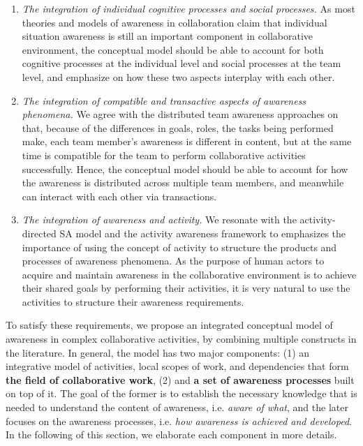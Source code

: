 \begin{enumerate}
	\item \emph{The integration of individual cognitive processes and social processes.} As most theories and models of awareness in collaboration claim that individual situation awareness is still an important component in collaborative environment, the conceptual model should be able to account for both cognitive processes at the individual level and social processes at the team level, and emphasize on how these two aspects interplay with each other. 
	\item \emph{The integration of compatible and transactive aspects of awareness phenomena.} We agree with the distributed team awareness approaches \cite{Salmon2010} on that, because of the differences in goals, roles, the tasks being performed make, each team member’s awareness is different in content, but at the same time is compatible for the team to perform collaborative activities successfully. Hence, the conceptual model should be able to account for how the awareness is distributed across multiple team members, and meanwhile can interact with each other via transactions. 
	\item \emph{The integration of awareness and activity.} We resonate with the activity-directed SA model \cite{Bedny1999} and the activity awareness framework \cite{carroll2003a} to emphasizes the importance of using the concept of activity to structure the products and processes of awareness phenomena. As the purpose of human actors to acquire and maintain awareness in the collaborative environment is to achieve their shared goals by performing their activities, it is very natural to use the activities to structure their awareness requirements. 
\end{enumerate}

To satisfy these requirements, we propose an integrated conceptual model of awareness in complex collaborative activities, by combining multiple constructs in the literature. In general, the model has two major components: (1) an integrative model of activities, local scopes of work, and dependencies that form \textbf{the field of collaborative work}, (2) and \textbf{a set of awareness processes} built on top of it. The goal of the former is to establish the necessary knowledge that is needed to understand the content of awareness, i.e. \emph{aware of what}, and the later focuses on the awareness processes, i.e. \emph{how awareness is achieved and developed}. In the following of this section, we elaborate each component in more details.

